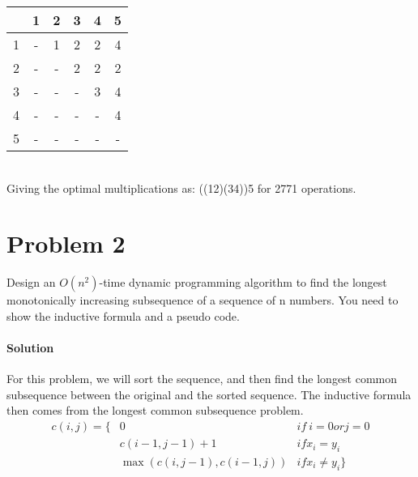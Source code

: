 \documentclass[12pt]{article}
\begin{document}
\begin{table}[h]
\centering
\begin{tabular}{|c|c|c|c|c|c|}
\hline
\multicolumn{1}{|l|}{} & \multicolumn{1}{|l|}{1} & \multicolumn{1}{l|}{2} & \multicolumn{1}{l|}{3} & \multicolumn{1}{l|}{4} & \multicolumn{1}{l|}{5} \\ \hline
1&  -                   &     1                 &        2               &         2              &      4             \\ \hline
2&-                       & -                     &      2                 &     2                  &       2            \\ \hline
3&-                       & -                     & -                     &     3                  &      4                 \\ \hline
4&-                       & -                     & -                     & -                     &   4                    \\ \hline
5&-                       & -                     & -                     & -                     &   -                   \\ \hline
\end{tabular}
\end{table}
\\
 Giving the optimal multiplications as: ((12)(34))5 for 2771 operations.

\section{Problem 2}
 Design an $O(n^2)$-time dynamic programming algorithm to find the longest monotonically increasing subsequence of a sequence of n numbers. You need to show the inductive formula and a pseudo code. 

\paragraph{Solution}
For this problem, we will sort the sequence, and then find the longest common subsequence between the original and the sorted sequence.
The inductive formula then comes from the longest common subsequence problem.
\begin{align*}
c(i,j) = \{ & 0 &if ~ i = 0 or j = 0\\
     	& c(i-1,j-1) + 1 & if x_i = y_i\\
           & \max ( c(i,j-1), c(i-1,j)) & if x_i \neq y_i \}
\end{align*}
\end{document}
